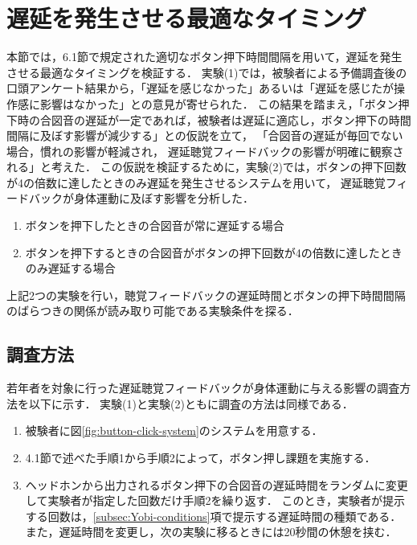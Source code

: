 \section{遅延を発生させる最適なタイミング}
本節では，6.1節で規定された適切なボタン押下時間間隔を用いて，遅延を発生させる最適なタイミングを検証する．
実験(1)では，被験者による予備調査後の口頭アンケート結果から，「遅延を感じなかった」あるいは「遅延を感じたが操作感に影響はなかった」との意見が寄せられた．
この結果を踏まえ，「ボタン押下時の合図音の遅延が一定であれば，被験者は遅延に適応し，ボタン押下の時間間隔に及ぼす影響が減少する」との仮説を立て，
「合図音の遅延が毎回でない場合，慣れの影響が軽減され，
遅延聴覚フィードバックの影響が明確に観察される」と考えた．
この仮説を検証するために，実験(2)では，ボタンの押下回数が4の倍数に達したときのみ遅延を発生させるシステムを用いて，
遅延聴覚フィードバックが身体運動に及ぼす影響を分析した．
\newpage
\begin{enumerate}[leftmargin=*, label=実験(\arabic*)]
    \item ボタンを押下したときの合図音が常に遅延する場合
    \item ボタンを押下するときの合図音がボタンの押下回数が4の倍数に達したときのみ遅延する場合
\end{enumerate}
上記2つの実験を行い，聴覚フィードバックの遅延時間とボタンの押下時間間隔のばらつきの関係が読み取り可能である実験条件を探る．
\subsection{調査方法}
若年者を対象に行った遅延聴覚フィードバックが身体運動に与える影響の調査方法を以下に示す．
実験(1)と実験(2)ともに調査の方法は同様である．
\begin{enumerate}[leftmargin=*]
  \item 被験者に図\ref{fig:button-click-system}のシステムを用意する．
  \item 4.1節で述べた手順1から手順2によって，ボタン押し課題を実施する．
  \item ヘッドホンから出力されるボタン押下の合図音の遅延時間をランダムに変更して実験者が指定した回数だけ手順2を繰り返す．
  このとき，実験者が提示する回数は，\ref{subsec:Yobi-conditions}項で提示する遅延時間の種類である．
  また，遅延時間を変更し，次の実験に移るときには20秒間の休憩を挟む．
\end{enumerate}
